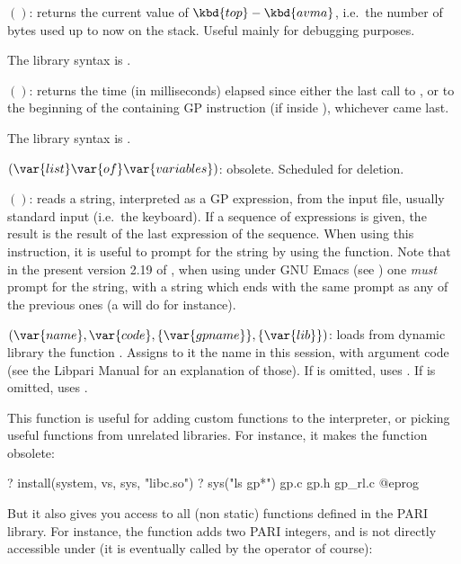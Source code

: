$()$: \label{se:getstack}returns the current value of $\kbd{top}-\kbd{avma}$, i.e.~the number of
bytes used up to now on the stack. Useful mainly for debugging purposes.

The library syntax is .

$()$: \label{se:gettime}returns the time (in milliseconds) elapsed since either the last call to
, or to the beginning of the containing GP instruction (if
inside ), whichever came last.

The library syntax is .

$(\var{list} \var{of} \var{variables})$: \label{se:global}obsolete. Scheduled for deletion.

$()$: \label{se:input}reads a string, interpreted as a GP expression,
from the input file, usually standard input (i.e.~the keyboard). If a
sequence of expressions is given, the result is the result of the last
expression of the sequence. When using this instruction, it is useful to
prompt for the string by using the  function. Note that in the
present version 2.19 of , when using  under GNU Emacs (see
) one \emph{must} prompt for the string, with a string
which ends with the same prompt as any of the previous ones (a 
will do for instance).

$(\var{name},\var{code},\{\var{gpname}\},\{\var{lib}\})$: \label{se:install}loads from dynamic library  the function . Assigns to it
the name  in this  session, with argument code 
(see the Libpari Manual for an explanation of those). If  is
omitted, uses . If  is omitted, uses
.

This function is useful for adding custom functions to the  interpreter,
or picking useful functions from unrelated libraries. For instance, it
makes the function  obsolete:

\bprog
? install(system, vs, sys, "libc.so")
? sys("ls gp*")
gp.c            gp.h            gp_rl.c
@eprog

But it also gives you access to all (non static) functions defined in the
PARI library. For instance, the function  adds
two PARI integers, and is not directly accessible under  (it is
eventually called by the \kbd{+} operator of course):

